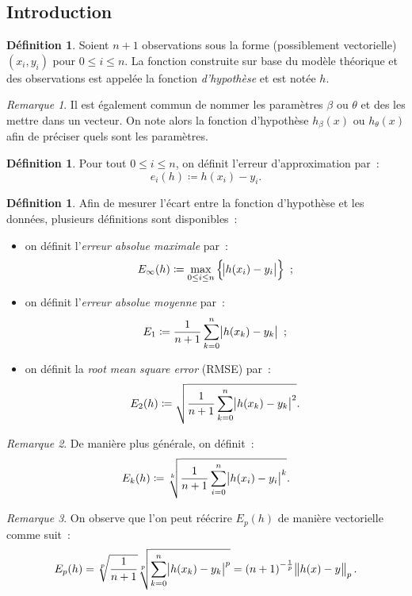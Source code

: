 \documentclass{article}
\theoremstyle{definition}
\newtheorem{déf}[thm]{Définition}
\theoremstyle{remark}
\newtheorem*{rmq}{Remarque}
\begin{document}
	\subsection{Introduction}
		\begin{déf} Soient $n+1$ observations sous la forme (possiblement vectorielle) $(x_i, y_i)$ pour $0 \leq i \leq n$. La fonction construite sur base du
		modèle théorique et des observations est appelée la fonction \emph{d'hypothèse} et est notée $h$.
		\end{déf}

		\begin{rmq} Il est également commun de nommer les paramètres $\beta$ ou $\theta$ et des les mettre dans un vecteur. On note alors la fonction d'hypothèse
		$h_\beta(x)$ ou $h_\theta(x)$ afin de préciser quels sont les paramètres.
		\end{rmq}

		\begin{déf} Pour tout $0 \leq i \leq n$, on définit l'erreur d'approximation par~:
		\[e_i(h) \coloneqq h(x_i) - y_i.\]
		\end{déf}

		\begin{déf} Afin de mesurer l'écart entre la fonction d'hypothèse et les données, plusieurs définitions sont disponibles~:
		\begin{itemize}
			\item on définit l'\emph{erreur absolue maximale} par~:
				\[E_\infty(h) \coloneqq \max_{0 \leq i \leq n}\left\{\abs{h(x_i)-y_i}\right\}~;\]
			\item on définit l'\emph{erreur absolue moyenne} par~:
				\[E_1 \coloneqq \frac 1{n+1}\sum_{k=0}^n\abs{h(x_k)-y_k}~;\]
			\item on définit la \emph{root mean square error} (RMSE) par~:
				\[E_2(h) \coloneqq \sqrt {\frac 1{n+1}\sum_{k=0}^n\abs{h(x_k)-y_k}^2}.\]
		\end{itemize}
		\end{déf}

		\begin{rmq} De manière plus générale, on définit~:
		\[E_k(h) \coloneqq \sqrt[k] {\frac 1{n+1}\sum_{i=0}^n\abs{h(x_i)-y_i}^k}.\]
		\end{rmq}

		\begin{rmq} On observe que l'on peut réécrire $E_p(h)$ de manière vectorielle comme suit~:
		\[E_p(h) = \sqrt[p] {\frac 1{n+1}}\sqrt[p] {\sum_{k=0}^n\abs{h(x_k)-y_k}^p} = \left(n+1\right)^{-\frac 1p}\norm {h(x)-y}_p.\]
		\end{rmq}
\end{document}

